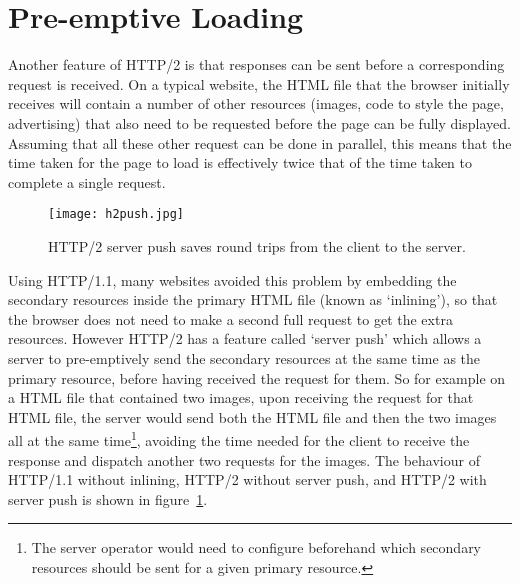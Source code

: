 \section{Pre-emptive Loading}

Another feature of HTTP/2 is that responses can be sent before a corresponding request is received. On a typical website, the HTML file that the browser initially receives will contain a number of other resources (images, code to style the page, advertising) that also need to be requested before the page can be fully displayed. Assuming that all these other request can be done in parallel, this means that the time taken for the page to load is effectively twice that of the time taken to complete a single request.

\begin{figure}
	\centering
	\texttt{[image: h2push.jpg]}
	\caption{HTTP/2 server push saves round trips from the client to the server.}
	\label{fig:h2push}
\end{figure}

Using HTTP/1.1, many websites avoided this problem by embedding the secondary resources inside the primary HTML file (known as `inlining'), so that the browser does not need to make a second full request to get the extra resources. However HTTP/2 has a feature called `server push' which allows a server to pre-emptively send the secondary resources at the same time as the primary resource, before having received the request for them. So for example on a HTML file that contained two images, upon receiving the request for that HTML file, the server would send both the HTML file and then the two images all at the same time\footnote{The server operator would need to configure beforehand which secondary resources should be sent for a given primary resource.}, avoiding the time needed for the client to receive the response and dispatch another two requests for the images. The behaviour of HTTP/1.1 without inlining, HTTP/2 without server push, and HTTP/2 with server push is shown in figure~\ref{fig:h2push}.

